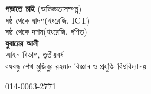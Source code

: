 \documentclass[serif]{beamer}
\begin{document}
\frame
{
\begin{center}
	\fontsize{32}{32}\selectfont \textbf{পড়াতে চাই} \hspace{0.4pt}\fontsize{9}{9}\selectfont(অভিজ্ঞতাসম্পন্ন) \\
	\vspace{12pt}
	\fontsize{11}{11}\selectfont
	ষষ্ঠ থেকে দ্বাদশ\hspace{4 pt}(ইংরেজি, ICT) \\
	ষষ্ঠ থেকে দশম\hspace{4 pt}(ইংরেজি, গণিত) \\
	\vspace{8 pt}
	\textbf{{\LARGE যুবায়ের আলী}}\\
	{\small আইন বিভাগ, তৃতীয়বর্ষ \\
	বঙ্গবন্ধু শেখ মুজিবুর রহমান বিজ্ঞান ও প্রযুক্তি বিশ্ববিদ্যালয়} \\
	\vspace{3 pt}
	\begin{tcolorbox}[title=যোগাযোগ, width=110pt]
		\faPhone \hspace{2 pt} 014-0063-2771
	\end{tcolorbox}
\end{center}
}
\end{document}
